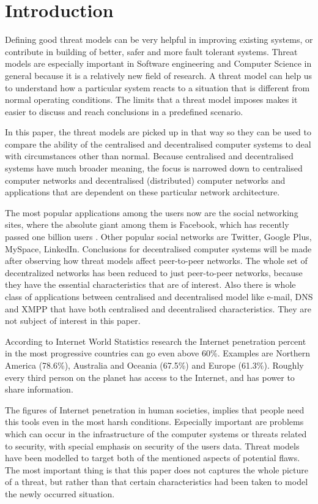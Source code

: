 \section{Introduction}
Defining good threat models can be very helpful in improving existing systems, or contribute in building of better, safer and more fault tolerant systems. Threat models are especially important in Software engineering and Computer Science in general because it is a relatively new field of research. A threat model can help us to understand how a particular system reacts to a situation that is different from normal operating conditions. The limits that a threat model imposes makes it easier to discuss and reach conclusions in a predefined scenario.

In this paper, the threat models are picked up in that way so they can be used to compare the ability of the centralised and decentralised computer systems to deal with circumstances other than normal. Because centralised and decentralised systems have much broader meaning, the focus is narrowed down to centralised computer networks and decentralised (distributed) computer networks and applications that are dependent on these particular network architecture. 

The most popular applications among the users now are the social networking sites, where the absolute giant among them is Facebook, which has recently passed one billion users \cite{web:facebookpassesbillion}. Other popular social networks are Twitter, Google Plus, MySpace, LinkedIn. Conclusions for decentralised computer systems will be made after observing how threat models affect peer-to-peer networks. The whole set of decentralized networks has been reduced to just peer-to-peer networks, because they have the essential characteristics that are of interest. Also there is whole class of applications between centralised and decentralised model like e-mail, DNS and XMPP that have both centralised and decentralised characteristics. They are not subject of interest in this paper.

According to Internet World Statistics research \cite{web:internetworldstats} the Internet penetration percent in the most progressive countries can go even above 60\%. Examples are Northern America (78.6\%), Australia and Oceania (67.5\%) and Europe (61.3\%). Roughly every third person on the planet has access to the Internet, and has power to share information. 

The figures of Internet penetration \cite{web:internetworldstats} in human societies, implies that people need this tools even in the most harsh conditions. Especially important are problems which can occur in the infrastructure of the computer systems or threats related to security, with special emphasis on security of the users data. Threat models have been modelled to target both of the mentioned aspects of potential flaws. The most important thing is that this paper does not captures the whole picture of a threat, but rather than that certain characteristics had been taken to model the newly occurred situation.

